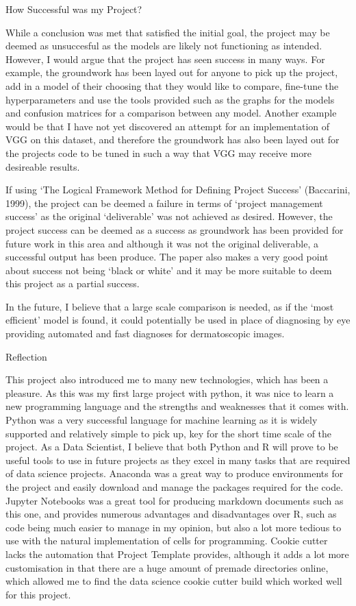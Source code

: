 \documentclass[11pt]{article}
\begin{document}
    How Successful was my Project?

While a conclusion was met that satisfied the initial goal, the project
may be deemed as unsuccesful as the models are likely not functioning as
intended. However, I would argue that the project has seen success in
many ways. For example, the groundwork has been layed out for anyone to
pick up the project, add in a model of their choosing that they would
like to compare, fine-tune the hyperparameters and use the tools
provided such as the graphs for the models and confusion matrices for a
comparison between any model. Another example would be that I have not
yet discovered an attempt for an implementation of VGG on this dataset,
and therefore the groundwork has also been layed out for the projects
code to be tuned in such a way that VGG may receive more desireable
results.

If using `The Logical Framework Method for Defining Project Success'
(Baccarini, 1999), the project can be deemed a failure in terms of
`project management success' as the original `deliverable' was not
achieved as desired. However, the project success can be deemed as a
success as groundwork has been provided for future work in this area and
although it was not the original deliverable, a successful output has
been produce. The paper also makes a very good point about success not
being `black or white' and it may be more suitable to deem this project
as a partial success.

In the future, I believe that a large scale comparison is needed, as if
the `most efficient' model is found, it could potentially be used in
place of diagnosing by eye providing automated and fast diagnoses for
dermatoscopic images.

    Reflection

This project also introduced me to many new technologies, which has been
a pleasure. As this was my first large project with python, it was nice
to learn a new programming language and the strengths and weaknesses
that it comes with. Python was a very successful language for machine
learning as it is widely supported and relatively simple to pick up, key
for the short time scale of the project. As a Data Scientist, I believe
that both Python and R will prove to be useful tools to use in future
projects as they excel in many tasks that are required of data science
projects. Anaconda was a great way to produce environments for the
project and easily download and manage the packages required for the
code. Jupyter Notebooks was a great tool for producing markdown
documents such as this one, and provides numerous advantages and
disadvantages over R, such as code being much easier to manage in my
opinion, but also a lot more tedious to use with the natural
implementation of cells for programming. Cookie cutter lacks the
automation that Project Template provides, although it adds a lot more
customisation in that there are a huge amount of premade directories
online, which allowed me to find the data science cookie cutter build
which worked well for this project.
\end{document}
